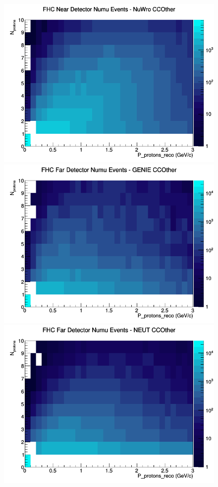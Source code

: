 \begin{figure}[h]
\includegraphics[width=\linewidth]{eff_N_P/LAr/protons/CCOther_FHC_ND_numu_N_P_NuWro.png}
\endminipage
\newline
{}
\includegraphics[width=\linewidth]{eff_N_P/LAr/protons/CCOther_FHC_FD_numu_N_P_GENIE.png}
\endminipage
{}
\includegraphics[width=\linewidth]{eff_N_P/LAr/protons/CCOther_FHC_FD_numu_N_P_NEUT.png}

\end{figure}
